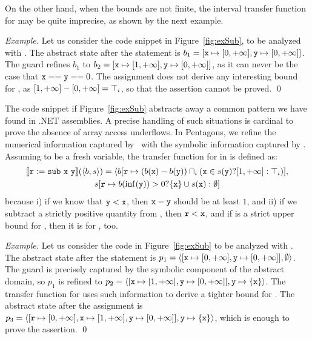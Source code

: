 \documentclass{elsart}
\begin{document}
On the other hand, when the bounds are not finite, the interval transfer function for  may be quite imprecise, as shown by the next example.

\textit{Example.}
Let us consider the code snippet in Figure~\ref{fig:exSub}, to be analyzed with \Intervals{}.
The abstract state after the  statement is $b_1 = [\mathtt{x} \mapsto [0, + \infty], \mathtt{y} \mapsto [0, +\infty]]$.
The guard refines $b_1$  to $b_2 = [\mathtt{x} \mapsto [1, + \infty], \mathtt{y} \mapsto [0, +\infty]]$, as it can never be the case that $\mathtt{x} == \mathtt{y} == 0$.
The assignment does not derive any interesting bound for , as $[1, +\infty] - [0, +\infty] = {\top}_i$, so that the assertion cannot be proved.
\qed

The code snippet if Figure~\ref{fig:exSub}  abstracts away a common pattern we have found in .NET assemblies.
A precise handling of such situations is cardinal to prove the absence of  array access underflows.
In Pentagons, we refine the numerical information captured by \Intervals\ with the symbolic information captured by \SUB.
Assuming  to be a fresh variable, the transfer function for  in \Pentagons{} is defined as:
\begin{multline*}
\mathbb{}\llbracket \mathtt{r := sub\ x\ y} \rrbracket(\langle b, s \rangle) = \langle b[\mathtt{r} \mapsto (b(\mathtt{x}) - b(\mathtt{y}))\sqcap_i (\mathtt{x} \in s(\mathtt{y}) ? [1, +\infty] : {\top}_i)],\\
s[\mathtt{r} \mapsto b(\mathrm{inf}(\mathtt{y})) > 0 ?  \{ \mathtt{x} \} \cup s(\mathtt{x}) : \emptyset ]
\end{multline*}
because i) if we know that $\mathtt{y} < \mathtt{x}$, then $\mathtt{x} - \mathtt{y}$ should be at least $1$, and ii) if we subtract a strictly positive quantity from , then $\mathtt{r} < \mathtt{x}$, and if  is a strict upper bound for , then it is for , too.

\textit{Example.}
Let us consider the code in Figure~\ref{fig:exSub} to be analyzed with \Pentagons.
The abstract state after the  statement is  $p_1 = \langle [\mathtt{x} \mapsto [0, + \infty], \mathtt{y} \mapsto [0, +\infty]], \emptyset \rangle$.
The guard is precisely captured by the symbolic component of the abstract domain, so $p_1$ is refined to $p_2 = \langle [\mathtt{x} \mapsto [1, + \infty], \mathtt{y} \mapsto [0, +\infty]], \mathtt{y} \mapsto \{ \mathtt{x}\}  \rangle$.
The transfer function for   uses such information to  derive a tighter bound for .
The abstract state after the assignment is $p_3 = \langle [\mathtt{r} \mapsto [0, +\infty], \mathtt{x} \mapsto [1, + \infty], \mathtt{y} \mapsto [0, +\infty]], \mathtt{y} \mapsto \{ \mathtt{x}\}  \rangle$, which is enough to prove the assertion.
\qed
\end{document}
